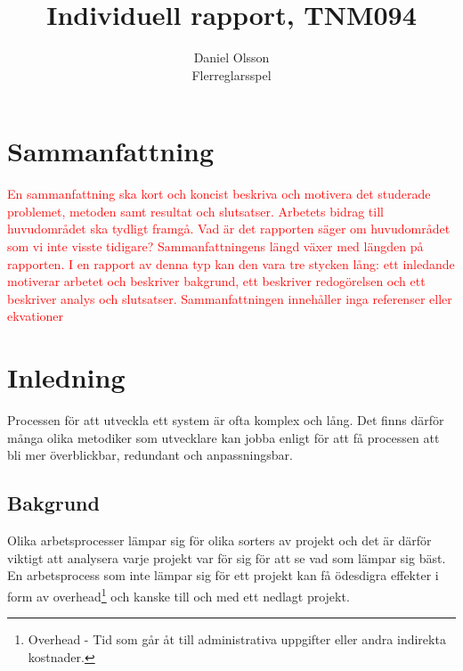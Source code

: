 \documentclass[a4paper,12pt,oneside,final]{extbook}
\title{Individuell rapport, TNM094}
\author{Daniel Olsson\\Flerreglarsspel}
\begin{document}
\pagestyle{empty}
\thispagestyle{empty}

\frontmatter

\maketitle

\pagestyle{fancy}

\chapter{Sammanfattning}

\textcolor{red}{
En sammanfattning ska kort och koncist beskriva och motivera det studerade problemet, metoden
samt resultat och slutsatser. Arbetets bidrag till huvudområdet ska tydligt framgå. Vad är det rapporten
säger om huvudområdet som vi inte visste tidigare?
Sammanfattningens längd växer med längden på rapporten. I en rapport av denna typ kan den vara tre
stycken lång: ett inledande motiverar arbetet och beskriver bakgrund, ett beskriver redogörelsen och
ett beskriver analys och slutsatser. Sammanfattningen innehåller inga referenser eller ekvationer}


\tableofcontents

\cleardoublepage
{}
\listoffigures

\cleardoublepage
{}
\listoftables

\mainmatter

\chapter{Inledning}
\label{ch:inledning}

Processen för att utveckla ett system är ofta komplex och lång. Det finns därför många olika metodiker som utvecklare kan jobba enligt för att få processen att bli mer överblickbar, redundant och anpassningsbar. 

\section{Bakgrund}
Olika arbetsprocesser lämpar sig för olika sorters av projekt och det är därför viktigt att analysera varje projekt var för sig för att se vad som lämpar sig bäst. En arbetsprocess som inte lämpar sig för ett projekt kan få ödesdigra effekter i form av overhead\footnote{Overhead - Tid som går åt till administrativa uppgifter eller andra indirekta kostnader.} och kanske till och med ett nedlagt projekt.
\end{document}
